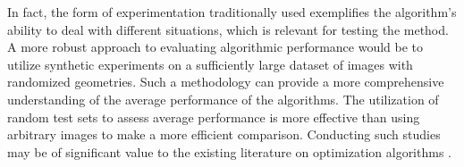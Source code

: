 			In fact, the form of experimentation traditionally used exemplifies the algorithm's ability to deal with different situations, which is relevant for testing the method. A more robust approach to evaluating algorithmic performance would be to utilize synthetic experiments on a sufficiently large dataset of images with randomized geometries. Such a methodology can provide a more comprehensive understanding of the average performance of the algorithms. The utilization of random test sets to assess average performance is more effective than using arbitrary images to make a more efficient comparison. Conducting such studies may be of significant value to the existing literature on optimization algorithms \citep{beiranvand2017best}. %
			
